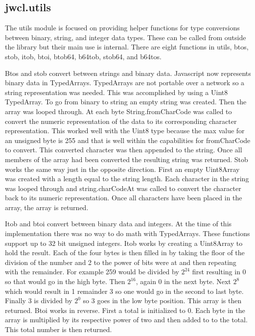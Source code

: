 \subsection{jwcl.utils}


The utils module is focused on providing helper functions for type conversions between binary, string, and integer data types. These can be called from outside the library but their main use is internal. There are eight functions in utils, btos, stob, itob, btoi, btob64, b64tob, stob64, and b64tos.


Btos and stob convert between strings and binary data. Javascript now represents binary data in TypedArrays.\cite{mdn-typedarrays} TypedArrays are not portable over a network so a string representation was needed. This was accomplished by using a Uint8 TypedArray. To go from binary to string an empty string was created. Then the array was looped through. At each byte String.fromCharCode was called to convert the numeric representation of the data to its corresponding character representation.\cite{mdn-charfrom} This worked well with the Uint8 type because the max value for an unsigned byte is 255 and that is well within the capabilities for fromCharCode to convert. This converted character was then appended to the string. Once all members of the array had been converted the resulting string was returned. Stob works the same way just in the opposite direction. First an empty Uint8Array was created with a length equal to the string length. Each character in the string was looped through and string.charCodeAt was called to convert the character back to its numeric representation.\cite{mdn-charat} Once all characters have been placed in the array, the array is returned.


Itob and btoi convert between binary data and integers. At the time of this implementation there was no way to do math with TypedArrays. These functions support up to 32 bit unsigned integers. Itob works by creating a Uint8Array to hold the result. Each of the four bytes is then filled in by taking the floor of the division of the number and 2 to the power of bits were at and then repeating with the remainder. For example 259 would be divided by $2^{24}$ first resulting in 0 so that would go in the high byte. Then $2^{16}$, again 0 in the next byte. Next $2^8$ which would result in 1 remainder 3 so one would go in the second to last byte. Finally 3 is divided by $2^0$ so 3 goes in the low byte position. This array is then returned. Btoi works in reverse. First a total is initialized to 0. Each byte in the array is multiplied by its respective power of two and then added to to the total. This total number is then returned.



